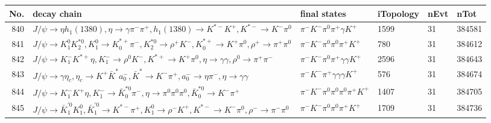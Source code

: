 \begin{table}[htbp] 
\begin{center}
\begin{small}
\begin{tabular}{rlllll}\hline\hline
 No. & decay chain & final states &  iTopology & nEvt & nTot \\\hline
840&$J/\psi       \rightarrow \eta          h_{1}(1380)    , \eta           \rightarrow \gamma       \pi^{-}        \pi^{+}        , h_{1}(1380)     \rightarrow K^{*-}         K^{+}          , K^{*-}          \rightarrow K^{-}          \pi^{0}        $&$\pi^{-}        K^{-}          \pi^{0}        \pi^{+}        \gamma       K^{+}          $& 1599&   31&384581\\
841&$J/\psi       \rightarrow K_1^{0}        K_2^{*0}       , K_1^{0}         \rightarrow K_{0}^{*+}     \pi^{-}        , K_2^{*0}        \rightarrow \rho^{+}      K^{-}          , K_{0}^{*+}      \rightarrow K^{+}          \pi^{0}        , \rho^{+}       \rightarrow \pi^{+}        \pi^{0}        $&$\pi^{-}        K^{-}          \pi^{0}        \pi^{0}        \pi^{+}        K^{+}          $&  780&   31&384612\\
842&$J/\psi       \rightarrow K_{1}^{-}      K^{*+}         \eta          , K_{1}^{-}       \rightarrow \rho^{0}      K^{-}          , K^{*+}          \rightarrow K^{+}          \pi^{0}        , \eta           \rightarrow \gamma       \gamma       , \rho^{0}       \rightarrow \pi^{+}        \pi^{-}        $&$\pi^{-}        K^{-}          \pi^{0}        \pi^{+}        \gamma       \gamma       K^{+}          $& 2596&   31&384643\\
843&$J/\psi       \rightarrow \gamma       \eta_{c}    , \eta_{c}     \rightarrow K^{+}          \bar{K}^{*}   a_{0}^{-}      , \bar{K}^{*}    \rightarrow K^{-}          \pi^{+}        , a_{0}^{-}       \rightarrow \eta          \pi^{-}        , \eta           \rightarrow \gamma       \gamma       $&$\pi^{-}        K^{-}          \pi^{+}        \gamma       \gamma       \gamma       K^{+}          $&  576&   31&384674\\
844&$J/\psi       \rightarrow K_{1}^{-}      K^{+}          \eta          , K_{1}^{-}       \rightarrow \bar{K}_0^{*0}\pi^{-}        , \eta           \rightarrow \pi^{0}        \pi^{0}        \pi^{0}        , \bar{K}_0^{*0} \rightarrow K^{-}          \pi^{+}        $&$\pi^{-}        K^{-}          \pi^{0}        \pi^{0}        \pi^{0}        \pi^{+}        K^{+}          $& 1407&   31&384705\\
845&$J/\psi       \rightarrow \bar{K}_1^{'0}K_1^{0}        , \bar{K}_1^{'0} \rightarrow K^{*-}         \pi^{+}        , K_1^{0}         \rightarrow \rho^{-}      K^{+}          , K^{*-}          \rightarrow K^{-}          \pi^{0}        , \rho^{-}       \rightarrow \pi^{-}        \pi^{0}        $&$\pi^{-}        K^{-}          \pi^{0}        \pi^{0}        \pi^{+}        K^{+}          $& 1709&   31&384736\\

\end{tabular}
\end{small}
\end{center}
\end{table}
